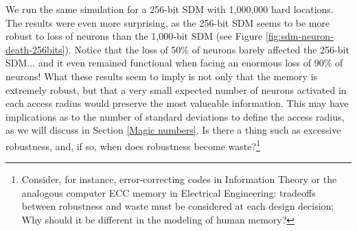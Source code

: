 We run the same simulation for a 256-bit SDM with 1,000,000 hard locations. The results were even more surprising, as the 256-bit SDM seems to be more robust to loss of neurons than the 1,000-bit SDM (see Figure \ref{fig:sdm-neuron-death-256bits}). Notice that the loss of 50\% of neurons barely affected the 256-bit SDM... and it even remained functional when facing an enormous loss of 90\% of neurons!  What these results seem to imply is not only that the memory is extremely robust, but that a very small expected number of neurons activated in each access radius would preserve the most valueable information.  This may have implications as to the number of standard deviations to define the access radius, as we will discuss in Section \ref{Magic numbers}.  Is there a thing such as excessive robustness, and, if so, when does robustness become waste?\footnote{Consider, for instance, error-correcting codes in Information Theory or the analogous computer ECC memory in Electrical Engineering: tradeoffs between robustness and waste must be considered at each design decision; Why should it be different in the modeling of human memory?}

